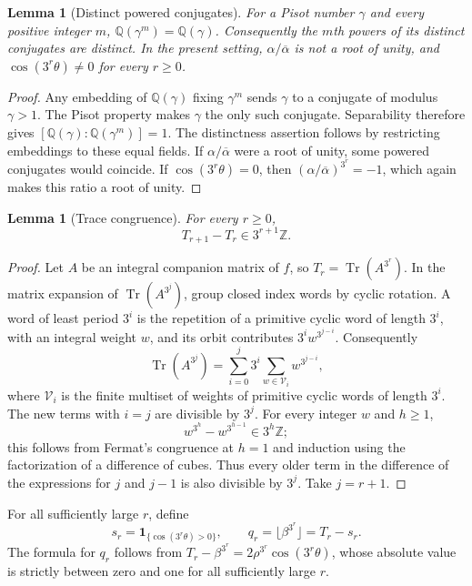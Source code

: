\documentclass[11pt,a4paper]{article}
\newtheorem{lemma}[theorem]{Lemma}
\theoremstyle{definition}
\theoremstyle{remark}
\numberwithin{equation}{section}
\begin{document}
\begin{lemma}[Distinct powered conjugates]
\label{ft:lem:pisot-power-fields}
For a Pisot number $\gamma$ and every positive integer $m$,
$\mathbb Q(\gamma^m)=\mathbb Q(\gamma)$. Consequently the $m$th
powers of its distinct conjugates are distinct. In the present setting,
$\alpha/\overline\alpha$ is not a root of unity, and
$\cos(3^r\theta)\ne0$ for every $r\geq0$.
\end{lemma}
\begin{proof}
Any embedding of $\mathbb Q(\gamma)$ fixing $\gamma^m$ sends
$\gamma$ to a conjugate of modulus $\gamma>1$. The Pisot property
makes $\gamma$ the only such conjugate. Separability therefore gives
$[\mathbb Q(\gamma):\mathbb Q(\gamma^m)]=1$.
The distinctness assertion follows by restricting embeddings to these
equal fields. If $\alpha/\overline\alpha$ were a root of unity,
some powered conjugates would coincide. If $\cos(3^r\theta)=0$,
then $(\alpha/\overline\alpha)^{3^r}=-1$, which again makes this
ratio a root of unity.
\end{proof}

\begin{lemma}[Trace congruence]
\label{ft:lem:cubic-ghost}
For every $r\geq0$,
\begin{equation}\label{ft:eq:cubic-ghost}
 T_{r+1}-T_r\in3^{r+1}\mathbb Z.
\end{equation}
\end{lemma}
\begin{proof}
Let $A$ be an integral companion matrix of $f$, so
$T_r=\operatorname{Tr}(A^{3^r})$. In the matrix expansion of
$\operatorname{Tr}(A^{3^j})$, group closed index words by cyclic
rotation. A word of least period $3^i$ is the repetition of a
primitive cyclic word of length $3^i$, with an integral weight $w$,
and its orbit contributes $3^i w^{3^{j-i}}$. Consequently
\[
 \operatorname{Tr}(A^{3^j})=
 \sum_{i=0}^{j}3^i\sum_{w\in\mathcal V_i}w^{3^{j-i}},
\]
where $\mathcal V_i$ is the finite multiset of weights of primitive
cyclic words of length $3^i$. The new terms with $i=j$ are divisible
by $3^j$. For every integer $w$ and $h\geq1$,
\[
 w^{3^h}-w^{3^{h-1}}\in3^h\mathbb Z;
\]
this follows from Fermat's congruence at $h=1$ and induction using
the factorization of a difference of cubes. Thus every older term
in the difference of the expressions for $j$ and $j-1$ is also
divisible by $3^j$. Take $j=r+1$.
\end{proof}

For all sufficiently large $r$, define
\[
 s_r=\mathbf 1_{\{\cos(3^r\theta)>0\}},\qquad
 q_r=\lfloor\beta^{3^r}\rfloor=T_r-s_r.
\]
The formula for $q_r$ follows from
$T_r-\beta^{3^r}=2\rho^{3^r}\cos(3^r\theta)$, whose absolute
value is strictly between zero and one for all sufficiently large $r$.
\end{document}
